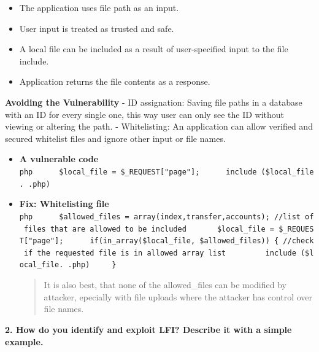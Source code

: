 \begin{itemize}
\tightlist
\item
  The application uses file path as an input.
\item
  User input is treated as trusted and safe.
\item
  A local file can be included as a result of user-specified input to
  the file include.
\item
  Application returns the file contents as a response.
\end{itemize}

\textbf{Avoiding the Vulnerability} - ID assignation: Saving file paths
in a database with an ID for every single one, this way user can only
see the ID without viewing or altering the path. - Whitelisting: An
application can allow verified and secured whitelist files and ignore
other input or file names.

\begin{itemize}
\item
  \textbf{A vulnerable code}
  \texttt{php\ \ \ \ \ \ \$local\_file\ =\ \$\_REQUEST{[}"page"{]};\ \ \ \ \ \ include\ (\$local\_file.\ \textquotesingle{}.php\textquotesingle{})}
\item
  \textbf{Fix: Whitelisting file}
  \texttt{php\ \ \ \ \ \ \$allowed\_files\ =\ array(\textquotesingle{}index\textquotesingle{},\textquotesingle{}transfer\textquotesingle{},\textquotesingle{}accounts\textquotesingle{});\ //list\ of\ files\ that\ are\ allowed\ to\ be\ included\ \ \ \ \ \ \ \$local\_file\ =\ \$\_REQUEST{[}"page"{]};\ \ \ \ \ \ if(in\_array(\$local\_file,\ \$allowed\_files))\ \{\ //check\ if\ the\ requested\ file\ is\ in\ allowed\ array\ list\ \ \ \ \ \ \ \ \ include\ (\$local\_file.\ \textquotesingle{}.php\textquotesingle{})\ \ \ \ \ \}}

  \begin{quote}
  It is also best, that none of the allowed\_files can be modified by
  attacker, epecially with file uploads where the attacker has control
  over file names.
  \end{quote}
\end{itemize}

\textbf{2. How do you identify and exploit LFI? Describe it with a
simple example.}

